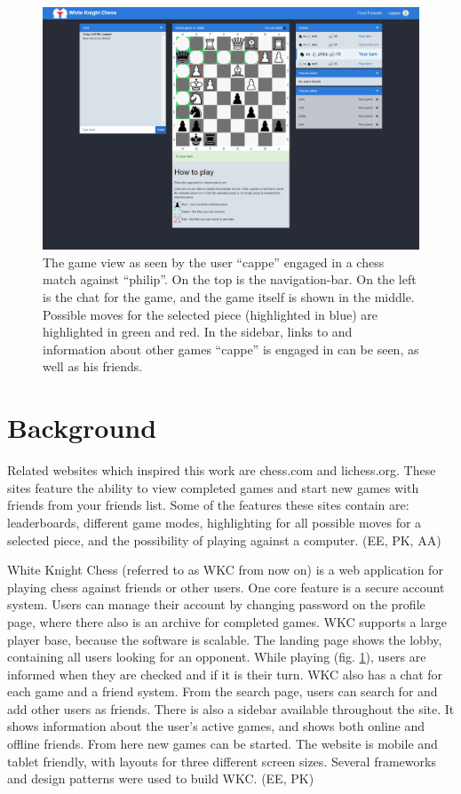 \documentclass[acmlarge, review=false, screen=true]{acmart}
\begin{document}
\begin{figure}
  \includegraphics[width=\textwidth]{images/screenshot-of-WKC.png}
  \caption{The game view as seen by the user “cappe” engaged in a chess match against “philip”. On the top is the navigation-bar. On the left is the chat for the game, and the game itself is shown in the middle. Possible moves for the selected piece (highlighted in blue) are highlighted in green and red. In the sidebar, links to and information about other games “cappe” is engaged in can be seen, as well as his friends.
  }
  \label{fig:game-view}
\end{figure}

\section{Background}
Related websites which inspired this work are chess.com and lichess.org\cite{chess.com, lichess.org}. These sites feature the ability to view completed games and start new games with friends from your friends list. Some of the features these sites contain are: leaderboards, different game modes, highlighting for all possible moves for a selected piece, and the possibility of playing against a computer. (EE, PK, AA)

White Knight Chess (referred to as WKC from now on) is a web application for playing chess against friends or other users. One core feature is a secure account system. Users can manage their account by changing password on the profile page, where there also is an archive for completed games. WKC supports a large player base, because the software is scalable. The landing page shows the lobby, containing all users looking for an opponent. While playing (fig. \ref{fig:game-view}), users are informed when they are checked and if it is their turn. WKC also has a chat for each game and a friend system. From the search page, users can search for and add other users as friends. There is also a sidebar available throughout the site. It shows information about the user’s active games, and shows both online and offline friends. From here new games can be started. The website is mobile and tablet friendly, with layouts for three different screen sizes. Several frameworks and design patterns were used to build WKC. (EE, PK)
\end{document}
